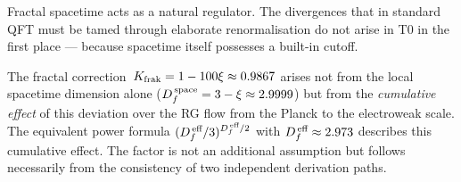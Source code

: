 Fractal spacetime acts as a natural regulator. The divergences that in standard QFT must be tamed through elaborate renormalisation do not arise in T0 in the first place --- because spacetime itself possesses a built-in cutoff.

\begin{zusammenfassung}
The fractal correction~$K_{\text{frak}} = 1 - 100\xi \approx 0.9867$ arises not from the local spacetime dimension alone ($D_f^{\,\text{space}} = 3 - \xi \approx 2.9999$) but from the \emph{cumulative effect} of this deviation over the RG flow from the Planck to the electroweak scale. The equivalent power formula $(D_f^{\,\text{eff}}/3)^{D_f^{\,\text{eff}}/2}$ with $D_f^{\,\text{eff}} \approx 2.973$ describes this cumulative effect. The factor is not an additional assumption but follows necessarily from the consistency of two independent derivation paths.
\end{zusammenfassung}
